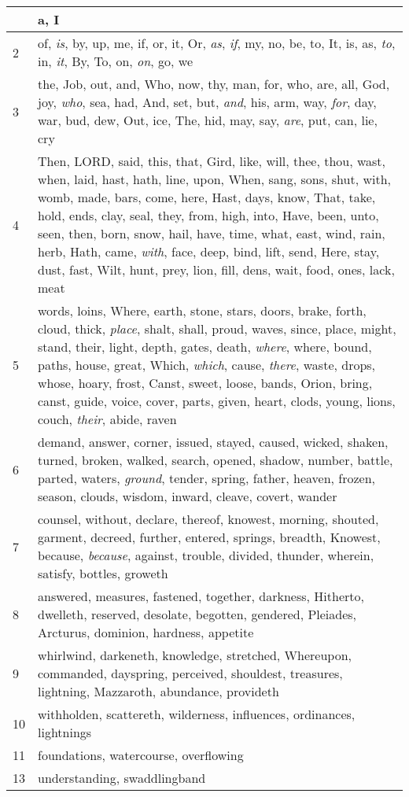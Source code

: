 \begin{longtable}{l|p{3.75in}}
\hline \hline
\endlastfoot
1 & a, I \\ \hline
2 & of, \emph{is}, by, up, me, if, or, it, Or, \emph{as}, \emph{if}, my, no, be, to, It, is, as, \emph{to}, in, \emph{it}, By, To, on, \emph{on}, go, we \\ \hline
3 & the, Job, out, and, Who, now, thy, man, for, who, are, all, God, joy, \emph{who}, sea, had, And, set, but, \emph{and}, his, arm, way, \emph{for}, day, war, bud, dew, Out, ice, The, hid, may, say, \emph{are}, put, can, lie, cry \\ \hline
4 & Then, LORD, said, this, that, Gird, like, will, thee, thou, wast, when, laid, hast, hath, line, upon, When, sang, sons, shut, with, womb, made, bars, come, here, Hast, days, know, That, take, hold, ends, clay, seal, they, from, high, into, Have, been, unto, seen, then, born, snow, hail, have, time, what, east, wind, rain, herb, Hath, came, \emph{with}, face, deep, bind, lift, send, Here, stay, dust, fast, Wilt, hunt, prey, lion, fill, dens, wait, food, ones, lack, meat \\ \hline
5 & words, loins, Where, earth, stone, stars, doors, brake, forth, cloud, thick, \emph{place}, shalt, shall, proud, waves, since, place, might, stand, their, light, depth, gates, death, \emph{where}, where, bound, paths, house, great, Which, \emph{which}, cause, \emph{there}, waste, drops, whose, hoary, frost, Canst, sweet, loose, bands, Orion, bring, canst, guide, voice, cover, parts, given, heart, clods, young, lions, couch, \emph{their}, abide, raven \\ \hline
6 & demand, answer, corner, issued, stayed, caused, wicked, shaken, turned, broken, walked, search, opened, shadow, number, battle, parted, waters, \emph{ground}, tender, spring, father, heaven, frozen, season, clouds, wisdom, inward, cleave, covert, wander \\ \hline
7 & counsel, without, declare, thereof, knowest, morning, shouted, garment, decreed, further, entered, springs, breadth, Knowest, because, \emph{because}, against, trouble, divided, thunder, wherein, satisfy, bottles, groweth \\ \hline
8 & answered, measures, fastened, together, darkness, Hitherto, dwelleth, reserved, desolate, begotten, gendered, Pleiades, Arcturus, dominion, hardness, appetite \\ \hline
9 & whirlwind, darkeneth, knowledge, stretched, Whereupon, commanded, dayspring, perceived, shouldest, treasures, lightning, Mazzaroth, abundance, provideth \\ \hline
10 & withholden, scattereth, wilderness, influences, ordinances, lightnings \\ \hline
11 & foundations, watercourse, overflowing \\ \hline
13 & understanding, swaddlingband \\ \hline
\end{longtable}






